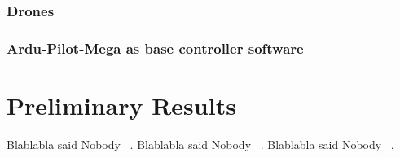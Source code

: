 \documentclass[11pt]{article}
\begin{document}
\subsubsection{Drones}
\label{sec:drones}
\subsubsection{Ardu-Pilot-Mega as base controller software}
\label{sec:APM}

\section{Preliminary Results}
\label{sec:results}
Blablabla said Nobody ~\cite{Merav}.
Blablabla said Nobody ~\cite{APM}.
Blablabla said Nobody ~\cite{RTComposer}.



    
    {}
\end{document}
